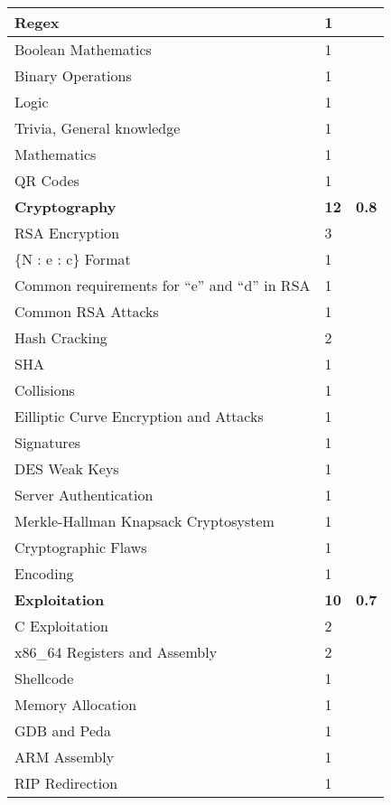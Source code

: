 \documentclass[a4paper,11pt]{report}
\begin{document}
\begin{center}
\begin{longtable}{| l | l | l |}
					\quad Regex & 1 & \\ \hline 
					\quad Boolean Mathematics & 1 & \\ \hline 
					\quad Binary Operations & 1 & \\ \hline 
					\quad Logic & 1 & \\ \hline 
					\quad Trivia, General knowledge & 1 & \\ \hline 
					\quad Mathematics & 1 & \\ \hline 
					\quad QR Codes & 1 & \\ \hline 
					\textbf{Cryptography} & \textbf{12} & \textbf{0.8} \\ \hline 
					\quad RSA Encryption & 3 & \\ \hline
						\qquad \{N : e : c\} Format & 1 & \\ \hline
						\qquad Common requirements for ``e'' and ``d'' in RSA & 1 & \\ \hline
						\qquad Common RSA Attacks & 1 & \\ \hline 
					\quad Hash Cracking & 2 & \\ \hline
						\qquad SHA & 1 & \\ \hline 
						\qquad Collisions & 1 & \\ \hline 
					\quad Eilliptic Curve Encryption and Attacks & 1 & \\ \hline 
					\quad Signatures & 1 & \\ \hline 
					\quad DES Weak Keys & 1 & \\ \hline 
					\quad Server Authentication & 1 & \\ \hline
					\quad Merkle-Hallman Knapsack Cryptosystem & 1 & \\ \hline
					\quad Cryptographic Flaws & 1 & \\ \hline 
					\quad Encoding & 1 & \\ \hline 
					\textbf{Exploitation} & \textbf{10} & \textbf{0.7} \\ \hline
					\quad C Exploitation & 2 & \\ \hline 
					\quad x86\_64 Registers and Assembly & 2 & \\ \hline
					\quad Shellcode & 1 & \\ \hline
					\quad Memory Allocation & 1 & \\ \hline
					\quad GDB and Peda & 1 & \\ \hline
					\quad ARM Assembly & 1 & \\ \hline
					\quad RIP Redirection & 1 & \\ \hline 

\end{longtable}
\end{center}
\end{document}
